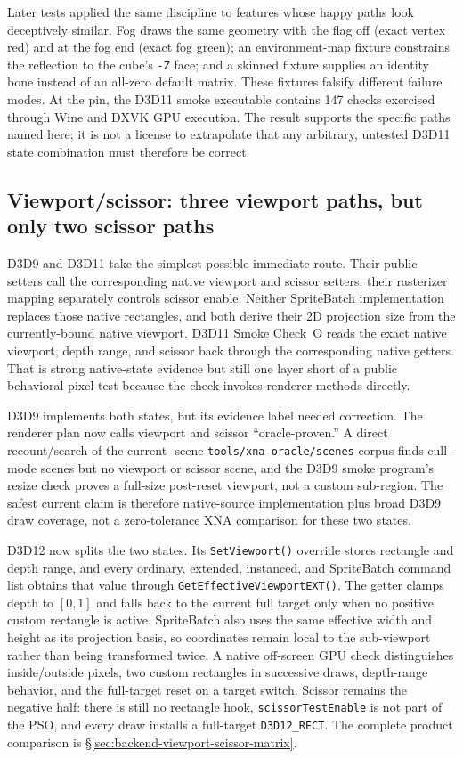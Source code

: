 Later tests applied the same discipline to features whose happy paths look deceptively similar.
Fog draws the same geometry with the flag off (exact vertex red) and at the fog end (exact fog
green); an environment-map fixture constrains the reflection to the cube's \texttt{-Z} face;
and a skinned fixture supplies an identity bone instead of an all-zero default matrix. These
fixtures falsify different failure modes. At the pin, the D3D11 smoke executable contains 147
checks exercised through Wine and DXVK GPU execution. The result supports the
specific paths named here; it is not a license to extrapolate that any arbitrary, untested
D3D11 state combination must therefore be correct.

\subsection{Viewport/scissor: three viewport paths, but only two scissor paths}

D3D9 and D3D11 take the simplest possible immediate route. Their public setters call the
corresponding native viewport and scissor setters; their rasterizer mapping separately controls
scissor enable. Neither SpriteBatch implementation replaces those native rectangles, and both
derive their 2D projection size from the currently-bound native viewport. D3D11 Smoke Check~O
reads the exact native viewport, depth range, and scissor back through the corresponding native
getters. That is strong native-state evidence but still one layer short of a public behavioral
pixel test because the check invokes renderer methods directly.

D3D9 implements both states, but its evidence label needed correction. The renderer plan
now calls viewport and scissor ``oracle-proven.'' A direct recount/search of the current
\XnaOracleSceneCount{}-scene \texttt{tools/xna-oracle/scenes} corpus finds cull-mode scenes but no viewport or
scissor scene, and the D3D9 smoke program's resize check proves a full-size post-reset viewport,
not a custom sub-region. The safest current claim is therefore native-source implementation
plus broad D3D9 draw coverage, not a zero-tolerance XNA comparison for these two states.

D3D12 now splits the two states. Its \texttt{SetViewport()} override stores rectangle and depth
range, and every ordinary, extended, instanced, and SpriteBatch command list obtains that value
through \texttt{GetEffectiveViewportEXT()}. The getter clamps depth to $[0,1]$ and falls back to
the current full target only when no positive custom rectangle is active. SpriteBatch also uses
the same effective width and height as its projection basis, so coordinates remain local to the
sub-viewport rather than being transformed twice. A native off-screen GPU check distinguishes
inside/outside pixels, two custom rectangles in successive draws, depth-range behavior, and the
full-target reset on a target switch. Scissor remains the negative half: there is still no
rectangle hook, \texttt{scissorTestEnable} is not part of the PSO, and every draw installs a
full-target \texttt{D3D12\_RECT}. The complete product comparison is
\S\ref{sec:backend-viewport-scissor-matrix}.


